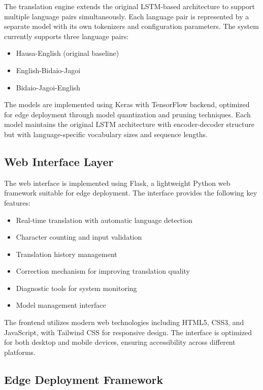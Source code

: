 \documentclass[conference]{IEEEtran}
\begin{document}
The translation engine extends the original LSTM-based architecture to support multiple language pairs simultaneously. Each language pair is represented by a separate model with its own tokenizers and configuration parameters. The system currently supports three language pairs:

\begin{itemize}
    \item Hausa-English (original baseline)
    \item English-Bidaio-Jagoi
    \item Bidaio-Jagoi-English
\end{itemize}

The models are implemented using Keras with TensorFlow backend, optimized for edge deployment through model quantization and pruning techniques. Each model maintains the original LSTM architecture with encoder-decoder structure but with language-specific vocabulary sizes and sequence lengths.

\subsection{Web Interface Layer}

The web interface is implemented using Flask, a lightweight Python web framework suitable for edge deployment. The interface provides the following key features:

\begin{itemize}
    \item Real-time translation with automatic language detection
    \item Character counting and input validation
    \item Translation history management
    \item Correction mechanism for improving translation quality
    \item Diagnostic tools for system monitoring
    \item Model management interface
\end{itemize}

The frontend utilizes modern web technologies including HTML5, CSS3, and JavaScript, with Tailwind CSS for responsive design. The interface is optimized for both desktop and mobile devices, ensuring accessibility across different platforms.

\subsection{Edge Deployment Framework}
\end{document}

